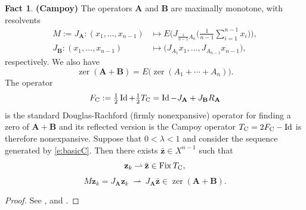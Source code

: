 \documentclass[11pt]{article}
\newcommand{\bz}{\ensuremath{\mathbf{z}}}
\newcommand{\weakly}{\ensuremath{\:{\rightharpoonup}\:}}
\newcommand{\thalb}{\ensuremath{\tfrac{1}{2}}}
\newcommand{\zer}{\ensuremath{\operatorname{zer}}}
\newcommand{\Fix}{\ensuremath{\operatorname{Fix}}}
\newcommand{\Id}{\ensuremath{\operatorname{Id}}}
\newcommand{\tc}{\ensuremath{T_{\text{\scriptsize C}}}}
\newcommand{\fc}{\ensuremath{F_{\text{\scriptsize C}}}}
\newcommand{\bA}{\ensuremath{{\mathbf{A}}}}
\newcommand{\bB}{\ensuremath{{\mathbf{B}}}}
\theoremstyle{definition}
\newtheorem{fact}[theorem]{Fact}
\providecommand{\Id}{\operatorname{{ Id}}}
\providecommand{\Id}{\operatorname{Id}}
\providecommand{\zer}{\operatorname{zer}}
\begin{document}
{\begin{fact} {\bf (Campoy)} 
\label{f:C}
The operators $\bA$ and $\bB$ are maximally monotone, with resolvents 
\begin{subequations}
\label{e:f:C}
\begin{align}
M := J_{\bA}\colon (x_1,\ldots,x_{n-1})&\mapsto E\bigg(J_{\frac{1}{n-1}A_n}\Big(
\tfrac{1}{n-1}\sum_{i=1}^{n-1}x_i\Big)\bigg),\label{e:f:Ca}\\
J_{\bB} \colon (x_1,\ldots,x_{n-1})&\mapsto 
\big(J_{A_1}x_1,\ldots,J_{A_{n-1}}x_{n-1} \big), 
\end{align}
\end{subequations}
respectively. 
We also have 
\begin{equation*}
\zer(\bA+\bB) = E\big(\zer(A_1+\cdots+A_n)\big).
\end{equation*}
The operator 
\begin{equation}
\label{e:CF}
\fc := \thalb\Id + \thalb\tc
=\Id-J_{\bA}+J_{\bB}R_{\bA} 
\end{equation}
is the standard Douglas-Rachford (firmly nonexpansive) 
operator for 
finding a zero of $\bA+\bB$ and its reflected version is the 
Campoy operator 
$\tc = 2\fc-\Id$ is therefore nonexpansive. 
Suppose that $0<\lambda<1$ and 
consider the sequence generated by 
\cref{e:basicC}. 
Then there exists $\bar{\bz}\in X^{n-1}$ such that 
\begin{equation*}
\bz_k\weakly \bar{\bz} \in \Fix\tc, 
\end{equation*}
\begin{equation*}
M\bz_{k} = J_{\bA}\bz_{k} \weakly J_{\bA}\bar{\bz}\in\zer(\bA+\bB).
\end{equation*}
\end{fact}
\begin{proof}
See \cite[Theorem~3.3(i)--(iii) and Theorem~5.1]{Campoy}, and \cite[Theorem~26.11]{BC2017}.
\end{proof}


}
\end{document}

